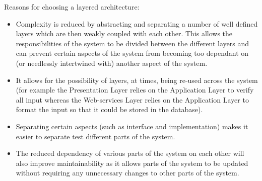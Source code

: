 \documentclass[hidelinks,a4paper,12pt]{article}
\begin{document}
\begin{enumerate}
		Reasons for choosing a layered architecture:
		\begin{itemize}
			\item Complexity is reduced by abstracting and separating a number of well defined layers which are then weakly coupled with each other. This allows the responsibilities of the system to be divided between the different layers and can prevent certain aspects of the system from becoming too dependant on (or needlessly intertwined with) another aspect of the system.
			\item It allows for the possibility of layers, at times, being re-used across the system (for example the Presentation Layer relies on the Application Layer to verify all input whereas the Web-services Layer relies on the Application Layer to format the input so that it could be stored in the database).
			\item Separating certain aspects (such as interface and implementation) makes it easier to separate test different parts of the system.
			\item The reduced dependency of various parts of the system on each other will also improve maintainability as it allows parts of the system to be updated without requiring any unnecessary changes to other parts of the system.
		\end{itemize}
		\begin{center}
		\end{center}
	\end{enumerate}
	
\end{document}

